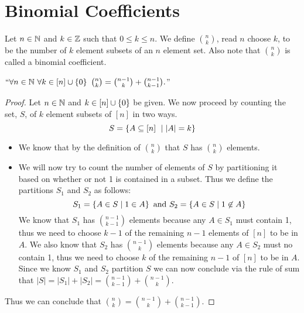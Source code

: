     \section{Binomial Coefficients}
        \begin{definition}
            Let $n \in \mathbb{N}$ and $k \in \mathbb{Z}$ such that $0 \le k \le n$.
            We define $\binom{n}{k}$, read $n$ choose $k$, to be the number of
            $k$ element subsets of an $n$ element set. Also note that $\binom{n}{k}$
            is called a binomial coefficient.
        \end{definition}
        \begin{lemma}
            $``\forall n \in \mathbb{N} \ \forall k \in [n] \cup \left\{0\right\} \
            \binom{n}{k} = \binom{n - 1}{k} + \binom{n - 1}{k - 1}.$''
            \label{rec binom lemma}
        \end{lemma}
        \begin{proof}
            Let $n \in \mathbb{N}$ and $k \in [n] \cup \left\{0\right\}$ be given. We now proceed
            by counting the set, $S$, of $k$ element subsets of $[n]$ in two ways.
            \[
                S = \left\{A \subseteq [n] \  \mid |A| = k\right\}
            \]
            \begin{itemize}
                \item
                    We know that by the definition of $\binom{n}{k}$ that $S$ has $\binom{n}{k}$
                    elements.
                \item
                    We will now try to count the number of elements of $S$ by partitioning it
                    based on whether or not 1 is contained in a subset. Thus we define the
                    partitions $S_1$ and $S_2$ as follows:
                    \[
                        S_1 = \left\{A \in S \mid 1 \in A\right\} \mbox{ and } S_2 = \left\{A \in S \mid 1 \not\in A\right\}
                    \]
                    We know that $S_1$ has $\binom{n - 1}{k - 1}$ elements because
                    any $A \in S_1$ must contain 1, thus we need to choose
                    $k - 1$ of the remaining $n - 1$ elements of $[n]$ to be in $A$. We also
                    know that $S_2$ has $\binom{n - 1}{k}$ elements because any $A \in S_2$ must
                    no contain 1, thus we need to choose $k$ of the remaining $n - 1$ of $[n]$ to
                    be in $A$. Since we know $S_1$ and $S_2$ partition $S$ we can now conclude
                    via the rule of sum that $|S| = |S_1| + |S_2| = \binom{n - 1}{k - 1} + \binom{n - 1}{k}.$
            \end{itemize}
            Thus we can conclude that $\binom{n}{k} = \binom{n - 1}{k} + \binom{n - 1}{k - 1}$. \QED
        \end{proof}
